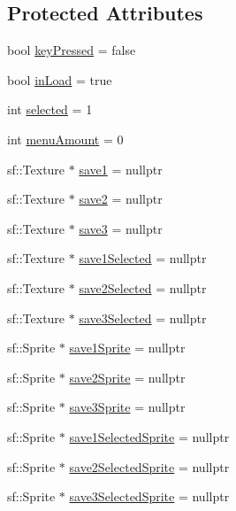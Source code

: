 \subsection*{Protected Attributes}
\begin{DoxyCompactItemize}
\item 
bool \hyperlink{classStateLoadGame_a6c57b0302c417a8921a20bdb27d46e6c}{key\+Pressed} = false
\item 
bool \hyperlink{classStateLoadGame_af05aaa81fec05eb682e63515a2371817}{in\+Load} = true
\item 
int \hyperlink{classStateLoadGame_adcf08bbcda5c396a52d513e9576f2b23}{selected} = 1
\item 
int \hyperlink{classStateLoadGame_a89730ad10d5c75a3ce4c0d8a0c6f4b79}{menu\+Amount} = 0
\item 
sf\+::\+Texture $\ast$ \hyperlink{classStateLoadGame_a2a5c509c4cd156c2c2a87d48bfad4dc3}{save1} = nullptr
\item 
sf\+::\+Texture $\ast$ \hyperlink{classStateLoadGame_ad22dae1eb1f206137141c4541e0a341f}{save2} = nullptr
\item 
sf\+::\+Texture $\ast$ \hyperlink{classStateLoadGame_aba66130e7326f084840240618da165b3}{save3} = nullptr
\item 
sf\+::\+Texture $\ast$ \hyperlink{classStateLoadGame_af96f94b2f2aaed0b12bca10a70595330}{save1\+Selected} = nullptr
\item 
sf\+::\+Texture $\ast$ \hyperlink{classStateLoadGame_a971e34122ac76a838f41eae75ce0b3db}{save2\+Selected} = nullptr
\item 
sf\+::\+Texture $\ast$ \hyperlink{classStateLoadGame_ae2c022f4ee36314deeb1dee268b27f26}{save3\+Selected} = nullptr
\item 
sf\+::\+Sprite $\ast$ \hyperlink{classStateLoadGame_ae2741620f063280ea2a411a1324a4228}{save1\+Sprite} = nullptr
\item 
sf\+::\+Sprite $\ast$ \hyperlink{classStateLoadGame_a34905a6e5de8cd397028f2d9dd5ec7ab}{save2\+Sprite} = nullptr
\item 
sf\+::\+Sprite $\ast$ \hyperlink{classStateLoadGame_a7efb6776361ae85a8af7c26dadb25876}{save3\+Sprite} = nullptr
\item 
sf\+::\+Sprite $\ast$ \hyperlink{classStateLoadGame_aa7e081110165166fd308eecc02f7ad21}{save1\+Selected\+Sprite} = nullptr
\item 
sf\+::\+Sprite $\ast$ \hyperlink{classStateLoadGame_a9aca2bc0f03aed72433473c88c2aabb8}{save2\+Selected\+Sprite} = nullptr
\item 
sf\+::\+Sprite $\ast$ \hyperlink{classStateLoadGame_ada925d86892b4f3ff5d33b8ca7c17957}{save3\+Selected\+Sprite} = nullptr
\end{DoxyCompactItemize}
